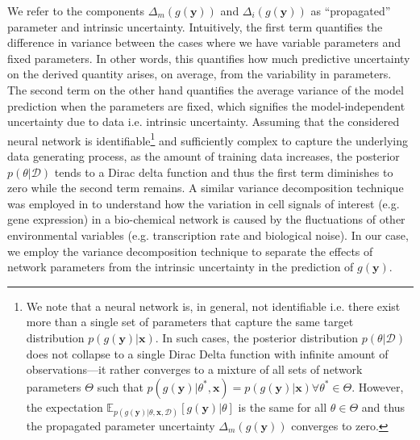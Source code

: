 We refer to the components $ \Delta_{m}(g(\mathbf{y})) $ and $ \Delta_{i}(g(\mathbf{y})) $ as ``propagated'' parameter and intrinsic uncertainty.  Intuitively, the first term quantifies the difference in variance between the cases where we have variable parameters and fixed parameters. In other words, this quantifies how much predictive uncertainty on the derived quantity arises, on average, from the variability in parameters. The second term on the other hand quantifies the average variance of the model prediction when the parameters are fixed, which signifies the model-independent uncertainty due to data i.e. intrinsic uncertainty.  Assuming that the considered neural network is identifiable\footnote{We note that a neural network is, in general, not identifiable i.e. there exist more than a single set of parameters that capture the same target distribution $p(g(\mathbf{y})|\mathbf{x})$. In such cases, the posterior distribution $p(\theta|\mathcal{D})$ does not collapse to a single Dirac Delta function with infinite amount of observations---it rather converges to a mixture of all sets of network parameters $\Theta$  such that $p(g(\mathbf{y})|\theta^{*},\mathbf{x}) = p(g(\mathbf{y})|\mathbf{x}) \forall \theta^{*} \in \Theta $. However, the expectation $\mathbb{E}_{p(g(\mathbf{y})|\theta,\mathbf{x},\mathcal{D})}[g(\mathbf{y})|\theta]$ is the same for all $\theta \in \Theta$ and thus the propagated parameter uncertainty $ \Delta_{m}(g(\mathbf{y}))$ converges to zero. } and sufficiently complex to capture the underlying data generating process, as the amount of training data increases, the posterior $p(\theta|\mathcal{D})$ tends to a Dirac delta function and thus the first term diminishes to zero while the second term remains. A similar variance decomposition technique was employed in \cite{bowsher2012identifying} to understand how the variation in cell signals of interest (e.g. gene expression) in a bio-chemical network is caused by the fluctuations of other environmental variables (e.g. transcription rate and biological noise). In our case, we employ the variance decomposition technique to separate the effects of network parameters from the intrinsic uncertainty in the prediction of $g(\mathbf{y})$.  


